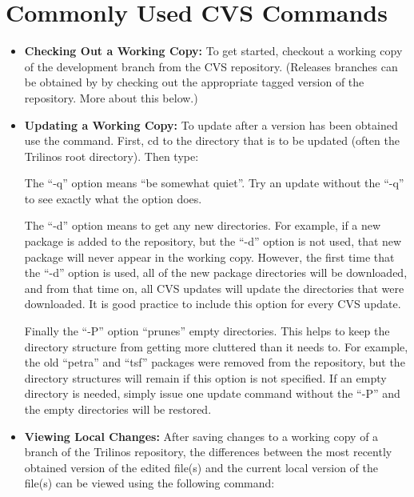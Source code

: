 \documentclass[12pt,strict]{TrilinosDevGuide}
\begin{document}
\clearpage



\appendix
\section{Commonly Used CVS Commands}
\label{Section:CVS}
\begin{itemize}
\item {\bf Checking Out a Working Copy:}
To get started, checkout a working copy of the development branch from the CVS 
repository.  (Releases branches can be obtained by by checking out the 
appropriate tagged version of the repository.  More about this below.)


\item {\bf Updating a Working Copy:}
To update after a version has been obtained use the  
command.  First, cd to the directory that is to be updated (often the 
Trilinos root directory).  Then type:


The ``-q'' option means ``be somewhat quiet''.  Try an update without the 
``-q'' to see exactly what the option does.  

The ``-d'' option means to get any new directories.  For example, if a new 
package is added to the repository, but the ``-d'' option is not used, that 
new package will never appear in the working copy.  However, the first time 
that the ``-d'' option is used, all of the new package directories will be 
downloaded, and from that time on, all CVS updates will update the 
directories that were downloaded.  It is good practice to include this 
option for every CVS update.

Finally the ``-P'' option ``prunes'' empty directories.  This helps to keep 
the directory structure from getting more cluttered than it needs to.  For 
example, the old ``petra'' and ``tsf'' packages were removed from the 
repository, but the directory structures will remain if this option is not 
specified.  If an empty directory is needed, simply issue one update 
command without the ``-P'' and the empty directories will be restored.

\item {\bf Viewing Local Changes:}
After saving changes to a working copy of a branch of the Trilinos repository, 
the differences between the most recently obtained version of the edited 
file(s) and the current local version of the file(s) can be viewed using the 
following command:


\end{itemize}
\end{document}
